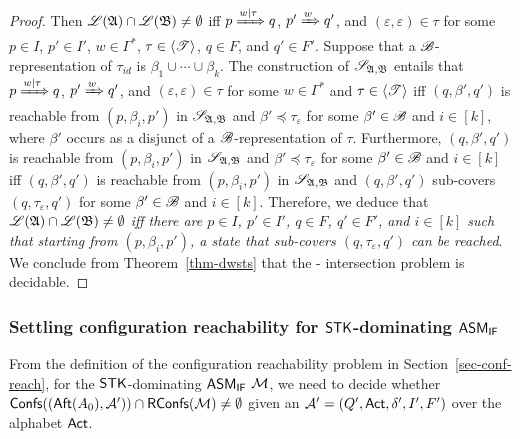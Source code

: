 \begin{proof}
Then ${\mathscr{L} }({\mathfrak{A} }) \cap {\mathscr{L} }({\mathfrak{B} }) \neq \emptyset$ iff $p \xRightarrow{w | \tau} q$, $p' \xRightarrow{w} q'$, and $(\varepsilon, \varepsilon) \in \tau$ for some $p \in I$, $p'\in I'$, $w \in \Gamma^*$, $\tau \in \langle {\mathscr{T} } \rangle$, $q \in F$, and $q' \in F'$. Suppose that a ${\mathscr{B} }$-representation of $\tau_{id}$ is $\beta_1 \cup \cdots \cup \beta_k$. 
The construction of $\mathscr{S}_{{\mathfrak{A} },{\mathfrak{B} }}$ entails that $p \xRightarrow{w | \tau} q$, $p' \xRightarrow{w} q'$, and $(\varepsilon, \varepsilon) \in \tau$ for some $w \in \Gamma^*$  and $\tau \in \langle {\mathscr{T} } \rangle$  iff $(q, \beta', q')$ is reachable from $(p, \beta_i, p')$ in $\mathscr{S}_{{\mathfrak{A} },{\mathfrak{B} }}$ and $\beta' \preceq \tau_\varepsilon$ for some $\beta' \in {\mathscr{B} }$ and $i \in [k]$, where $\beta'$ occurs as a disjunct of a ${\mathscr{B} }$-representation of $\tau$. 
%
Furthermore, $(q, \beta', q')$ is reachable from $(p, \beta_i, p')$ in $\mathscr{S}_{{\mathfrak{A} },{\mathfrak{B} }}$ and $\beta' \preceq \tau_\varepsilon$ for some $\beta' \in {\mathscr{B} }$ and $i \in [k]$ iff $(q, \beta', q')$ is reachable from $(p, \beta_i, p')$ in $\mathscr{S}_{{\mathfrak{A} },{\mathfrak{B} }}$ and $(q, \beta', q')$ sub-covers $(q, \tau_\varepsilon, q')$ for some $\beta' \in {\mathscr{B} }$ and $i \in [k]$. Therefore, we deduce that \emph{${\mathscr{L} }({\mathfrak{A} }) \cap {\mathscr{L} }({\mathfrak{B} }) \neq \emptyset$ iff there are $p \in I$, $p' \in I'$, $q \in F$, $q' \in F'$, and $i \in [k]$ such that starting from $(p, \beta_i, p')$, a state that sub-covers $(q, \tau_\varepsilon, q')$ can be reached}.
We conclude from Theorem~\ref{thm-dwsts} that the {\WOTrNFA}-{\NFA} intersection problem is decidable.
\end{proof}


\subsubsection{Settling configuration reachability for ${\sf STK}$-dominating $\textsf{ASM}_\textsf{IF}$}\label{sec-ifamass-reach}

From the definition of the configuration reachability problem in Section~\ref{sec-conf-reach}, for the ${\sf STK}$-dominating $\textsf{ASM}_\textsf{IF}$ ${\mathcal{M} }$, we need to decide whether ${\mathsf{Confs} }(({\sf Aft}(A_0), {\mathcal{A} }')) \cap \mathsf{RConfs}({\mathcal{M} }) \neq \emptyset$ given an {\NFA} ${\mathcal{A} }' = (Q', {\sf Act}, \delta', I', F')$ over the alphabet ${\sf Act}$. 

